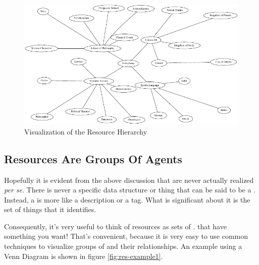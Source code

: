 \begin{figure}
        \begin{center}\includegraphics[width=\myfigwidth,height=\myfigheight,keepaspectratio]{figs/dot/res_example2}\end{center}
        \caption{Visualization of the Resource Hierarchy}\label{fig:res-example2}
\end{figure}

\subsection{Resources Are Groups Of Agents}

Hopefully it is evident from the above discussion that \resources{} are never actually realized \emph{per se}.  There is never a specific data structure or thing that can be said to be a \resource.  Instead, a \resource{} is more like a description or a tag.  What is significant about it is the set of things that it identifies.

Consequently, it's very useful to think of resources as sets of \agents{}.  \Agents{} that have something you want!  That's convenient, because it is very easy to use common techniques to visualize groups of \agents{} and their relationships.  An example using a Venn Diagram is shown in figure \ref{fig:res-example1}.

